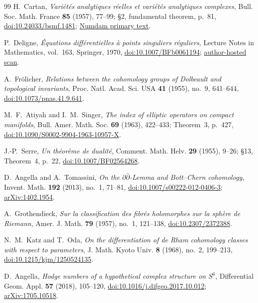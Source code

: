 \begin{thebibliography}{99}
H.~Cartan,
\emph{Vari\'et\'es analytiques r\'eelles et vari\'et\'es analytiques complexes},
Bull. Soc. Math. France \textbf{85} (1957), 77--99; \S2,
fundamental theorem, p.~81,
\href{https://doi.org/10.24033/bsmf.1481}{doi:10.24033/bsmf.1481};
\href{https://www.numdam.org/articles/10.24033/bsmf.1481/}%
{Numdam primary text}.

P.~Deligne,
\emph{\'Equations diff\'erentielles \`a points singuliers r\'eguliers},
Lecture Notes in Mathematics, vol.~163, Springer, 1970,
\href{https://doi.org/10.1007/BFb0061194}{doi:10.1007/BFb0061194};
\href{https://publications.ias.edu/sites/default/files/Number9.pdf}%
{author-hosted scan}.

A.~Fr\"olicher,
\emph{Relations between the cohomology groups of Dolbeault and topological
invariants},
Proc. Natl. Acad. Sci. USA \textbf{41} (1955), no.~9, 641--644,
\href{https://doi.org/10.1073/pnas.41.9.641}{doi:10.1073/pnas.41.9.641}.

M.~F.~Atiyah and I.~M.~Singer,
\emph{The index of elliptic operators on compact manifolds},
Bull. Amer. Math. Soc. \textbf{69} (1963), 422--433;
Theorem~3, p.~427,
\href{https://doi.org/10.1090/S0002-9904-1963-10957-X}%
{doi:10.1090/S0002-9904-1963-10957-X}.

J.-P.~Serre,
\emph{Un th\'eor\`eme de dualit\'e},
Comment. Math. Helv. \textbf{29} (1955), 9--26;
\S13, Theorem~4, p.~22,
\href{https://doi.org/10.1007/BF02564268}{doi:10.1007/BF02564268}.

D.~Angella and A.~Tomassini,
\emph{On the $\partial\bar\partial$-Lemma and Bott--Chern cohomology},
Invent. Math. \textbf{192} (2013), no.~1, 71--81,
\href{https://doi.org/10.1007/s00222-012-0406-3}%
{doi:10.1007/s00222-012-0406-3};
\href{https://arxiv.org/abs/1402.1954}{arXiv:1402.1954}.

A.~Grothendieck,
\emph{Sur la classification des fibr\'es holomorphes sur la sph\`ere de
Riemann},
Amer. J. Math. \textbf{79} (1957), no.~1, 121--138,
\href{https://doi.org/10.2307/2372388}{doi:10.2307/2372388}.

N.~M.~Katz and T.~Oda,
\emph{On the differentiation of de Rham cohomology classes with respect to
parameters},
J. Math. Kyoto Univ. \textbf{8} (1968), no.~2, 199--213,
\href{https://doi.org/10.1215/kjm/1250524135}%
{doi:10.1215/kjm/1250524135}.

D.~Angella,
\emph{Hodge numbers of a hypothetical complex structure on $S^6$},
Differential Geom. Appl. \textbf{57} (2018), 105--120,
\href{https://doi.org/10.1016/j.difgeo.2017.10.012}%
{doi:10.1016/j.difgeo.2017.10.012};
\href{https://arxiv.org/abs/1705.10518}{arXiv:1705.10518}.


\end{thebibliography}
